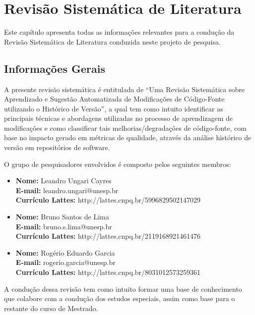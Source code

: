\chapter{Revisão Sistemática de Literatura}
\label{chapter:revisao}

Este capítulo apresenta todas as informações relevantes para a condução da Revisão Sistemática de Literatura conduzida neste projeto de pesquisa.

\section{Informações Gerais}

A presente revisão sistemática é entitulada de ``Uma Revisão Sistemática sobre Aprendizado e Sugestão Automatizada de Modificações de Código-Fonte utilizando o Histórico de Versão'', a qual tem como intuito identificar as principais técnicas e abordagens utilizadas no processo de aprendizagem de modificações e como classificar tais melhorias/degradações de código-fonte, com base no impacto gerado em métricas de qualidade, através da análise histórico de versão em repositórios de software.

O grupo de pesquisadores envolvidos é composto pelos seguintes membros:

\begin{itemize}
\item \textbf{Nome:} Leandro Ungari Cayres\\
	  \textbf{E-mail:} leandro.ungari@unesp.br\\
	  \textbf{Currículo Lattes:} http://lattes.cnpq.br/5996829502147029\\
\item \textbf{Nome:} Bruno Santos de Lima\\
	  \textbf{E-mail:} bruno.s.lima@unesp.br\\
	  \textbf{Currículo Lattes:} http://lattes.cnpq.br/2119168921461476\\
\item \textbf{Nome:} Rogério Eduardo Garcia\\
	  \textbf{E-mail:} rogerio.garcia@unesp.br\\
	  \textbf{Currículo Lattes:} http://lattes.cnpq.br/8031012573259361\\

\end{itemize}

A condução dessa revisão tem como intuito formar uma base de conhecimento que colabore com a condução dos estudos especiais, assim como base para o restante do curso de Mestrado.

